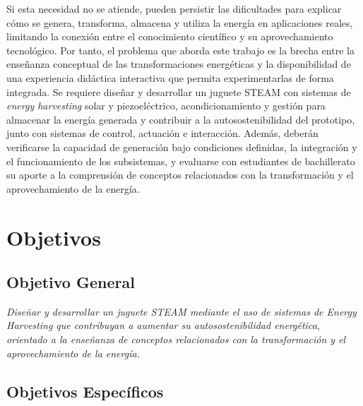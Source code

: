 \documentclass[11pt]{article}
\begin{document}
Si esta necesidad no se atiende, pueden persistir las dificultades para explicar cómo se genera, transforma, almacena y utiliza la energía en aplicaciones reales, limitando la conexión entre el conocimiento científico y su aprovechamiento tecnológico. Por tanto, el problema que aborda este trabajo es la brecha entre la enseñanza conceptual de las transformaciones energéticas y la disponibilidad de una experiencia didáctica interactiva que permita experimentarlas de forma integrada. Se requiere diseñar y desarrollar un juguete STEAM con sistemas de \textit{energy harvesting} solar y piezoeléctrico, acondicionamiento y gestión para almacenar la energía generada y contribuir a la autosostenibilidad del prototipo, junto con sistemas de control, actuación e interacción. Además, deberán verificarse la capacidad de generación bajo condiciones definidas, la integración y el funcionamiento de los subsistemas, y evaluarse con estudiantes de bachillerato su aporte a la comprensión de conceptos relacionados con la transformación y el aprovechamiento de la energía.

\newpage
\section{Objetivos}
\subsection{Objetivo General}
\textit{Diseñar y desarrollar un juguete STEAM mediante el uso de sistemas de \textit{Energy Harvesting} que contribuyan a aumentar su autosostenibilidad energética, orientado a la enseñanza de conceptos relacionados con la transformación y el aprovechamiento de la energía.}


\subsection{Objetivos Específicos}
\end{document}
